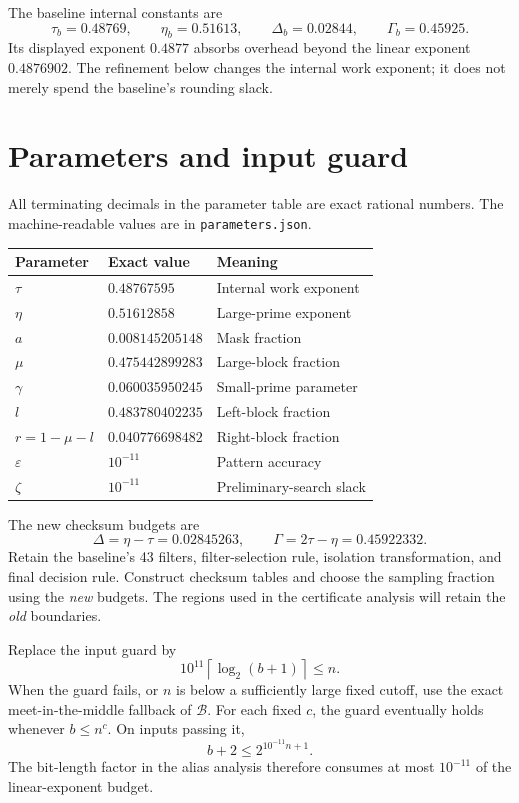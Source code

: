 \documentclass[11pt,a4paper]{article}
\theoremstyle{remark}
\newcommand{\Base}{\ensuremath{\mathcal{B}}}
\newcommand{\eps}{\varepsilon}
\newcommand{\logtwo}{\log_2}
\begin{document}
The baseline internal constants are
\begin{equation}
\label{eq:baseline}
 \tau_b=0.48769,\qquad \eta_b=0.51613,\qquad
 \Delta_b=0.02844,\qquad \Gamma_b=0.45925.
\end{equation}
Its displayed exponent $0.4877$ absorbs overhead beyond the linear
exponent $0.4876902$. The refinement below changes the internal work
exponent; it does not merely spend the baseline's rounding slack.

\section{Parameters and input guard}
\label{sec:parameters}

All terminating decimals in the parameter table are exact rational
numbers. The machine-readable values are in \texttt{parameters.json}.
\begin{center}
\begin{tabular}{@{}lll@{}}
\toprule
Parameter & Exact value & Meaning\\
\midrule
$\tau$ & $0.48767595$ & Internal work exponent\\
$\eta$ & $0.51612858$ & Large-prime exponent\\
$a$ & $0.008145205148$ & Mask fraction\\
$\mu$ & $0.475442899283$ & Large-block fraction\\
$\gamma$ & $0.060035950245$ & Small-prime parameter\\
$l$ & $0.483780402235$ & Left-block fraction\\
$r=1-\mu-l$ & $0.040776698482$ & Right-block fraction\\
$\eps$ & $10^{-11}$ & Pattern accuracy\\
$\zeta$ & $10^{-11}$ & Preliminary-search slack\\
\bottomrule
\end{tabular}
\end{center}
The new checksum budgets are
\begin{equation}
\label{eq:budgets}
 \Delta=\eta-\tau=0.02845263,\qquad
 \Gamma=2\tau-\eta=0.45922332.
\end{equation}
Retain the baseline's 43 filters, filter-selection rule, isolation
transformation, and final decision rule. Construct checksum tables and
choose the sampling fraction using the \emph{new} budgets. The regions
used in the certificate analysis will retain the \emph{old} boundaries.

Replace the input guard by
\begin{equation}
\label{eq:guard}
 10^{11}\left\lceil\logtwo(b+1)\right\rceil\le n.
\end{equation}
When the guard fails, or $n$ is below a sufficiently large fixed cutoff,
use the exact meet-in-the-middle fallback of \Base. For each fixed $c$,
the guard eventually holds whenever $b\le n^c$. On inputs passing it,
\begin{equation}
\label{eq:bitfactor}
 b+2\le 2^{10^{-11}n+1}.
\end{equation}
The bit-length factor in the alias analysis therefore consumes at most
$10^{-11}$ of the linear-exponent budget.
\end{document}
